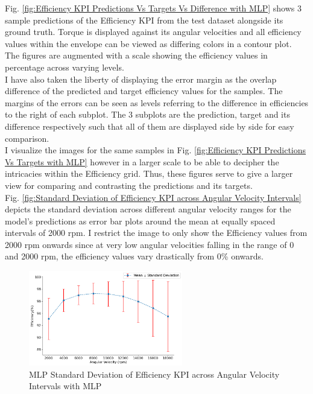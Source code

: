 \documentclass{report} %
\begin{document}
Fig. \ref{fig:Efficiency KPI Predictions Vs Targets Vs Difference with MLP} shows 3 sample predictions of the Efficiency \ac{KPI} from the test dataset alongside its ground truth.
Torque is displayed against its angular velocities and all efficiency values within the envelope can be viewed as differing colors in a contour plot. 
The figures are augmented with a scale showing the efficiency values in percentage across varying levels. \\
I have also taken the liberty of displaying the error margin as the overlap difference 
of the predicted and target efficiency values for the samples. 
The margins of the errors can be seen as levels referring to the difference in efficiencies to the right of each subplot. The 3 subplots are the prediction, target 
and its difference respectively such that all of them are displayed side by side for easy comparison. \\

I visualize the images for the same samples in Fig. \ref{fig:Efficiency KPI Predictions Vs Targets with MLP} however in a larger scale to be able to decipher 
the intricacies within the Efficiency grid. Thus, these figures serve to give a larger view for comparing and contrasting the predictions and its targets.\\

Fig. \ref{fig:Standard Deviation of Efficiency KPI across Angular Velocity Intervals} depicts the standard deviation across different 
angular velocity ranges for the model's predictions as error bar plots around the mean at equally spaced intervals of 2000 rpm.
I restrict the image to only show the Efficiency values from 2000 rpm onwards since at very low angular velocities falling in the range of 0 and 2000 rpm, the efficiency 
values vary drastically from 0\% onwards.

\begin{figure}[H]
    \centering
    \includegraphics[width=0.6\textwidth]{./ReportImages/stddev_y2_nn_MLP.png} 
    \caption{\ac{MLP} Standard Deviation of Efficiency \ac{KPI} across Angular Velocity Intervals with \ac{MLP}} 
    \label{fig:MLP Standard Deviation of 3D KPI(Efficiency) across Angular Velocity Intervals with MLP}
\end{figure}
\end{document}

